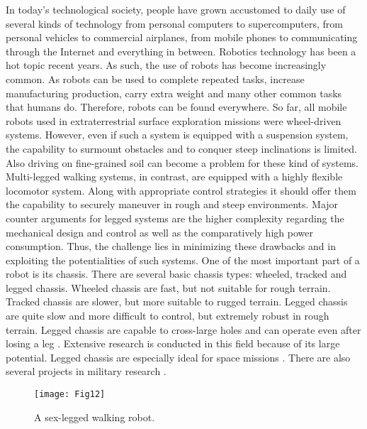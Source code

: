 


In today’s technological society, people have grown accustomed to daily use of several kinds of technology from personal computers to supercomputers, from personal vehicles to commercial airplanes, from mobile phones to communicating through the Internet and everything in between. Robotics technology has been a hot topic recent years.  As such, the use of robots has become increasingly common. As robots can be used to complete repeated tasks, increase manufacturing production, carry extra weight and many other common tasks that humans do. Therefore, robots can be found everywhere. 
So far, all mobile robots used in extraterrestrial surface exploration missions were wheel-driven systems. However, even if such a system is equipped with a suspension system, the capability to surmount obstacles and to conquer steep inclinations is limited. Also driving on fine-grained soil can become a problem for these kind of systems. Multi-legged walking systems, in contrast, are equipped with a highly flexible locomotor system. Along with appropriate control strategies it should offer them the capability to securely maneuver in rough and steep environments. Major counter arguments for legged systems are the higher complexity regarding the mechanical design and control as well as the comparatively high power consumption. Thus, the challenge lies in minimizing these drawbacks and in exploiting the potentialities of such systems. 
One of the most important part of a robot is its chassis. There are several basic chassis types: wheeled, tracked and legged chassis. Wheeled chassis are fast, but not suitable for rough terrain. Tracked chassis are slower, but more suitable to rugged terrain. Legged chassis are quite slow and more difficult to control, but extremely robust in rough terrain. Legged chassis are capable to cross-large holes and can operate even after losing a leg \cite{1}. Extensive research is conducted in this field because of its large potential. Legged chassis are especially ideal for space missions \cite{2,3} . There are also several projects in military research \cite{4,5}.
\begin{figure}[h]
    \centering
    \texttt{[image: Fig12]}
    \caption{ A sex-legged walking robot.}
    \label{fig1}
\end{figure}

